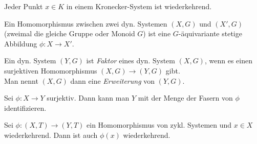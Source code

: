 \documentclass{cheat-sheet}
\begin{document}
\begin{thm}
  Jeder Punkt $x \in K$ in einem Kronecker-System ist wiederkehrend.
\end{thm}


\begin{defn}
  Ein Homomorphismus zwischen zwei dyn. Systemen $(X, G)$ und $(X', G)$ (zweimal die gleiche Gruppe oder Monoid $G$) ist eine $G$-äquivariante stetige Abbildung $\phi : X \to X'$.
\end{defn}

\begin{defn}
  Ein dyn. System $(Y, G)$ ist \emph{Faktor} eines dyn. System $(X, G)$, wenn es einen surjektiven Homomorphismus $(X, G) \to (Y, G)$ gibt. \\
  Man nennt $(X, G)$ dann eine \emph{Erweiterung} von $(Y, G)$.
\end{defn}

\begin{bem}
  Sei $\phi : X \to Y$ surjektiv. Dann kann man $Y$ mit der Menge der Fasern von $\phi$ identifizieren.
\end{bem}

\begin{thm}
  Sei $\phi : (X, T) \to (Y, T)$ ein Homomorphismus von zykl. Systemen und $x \in X$ wiederkehrend. Dann ist auch $\phi(x)$ wiederkehrend.
\end{thm}
\end{document}

